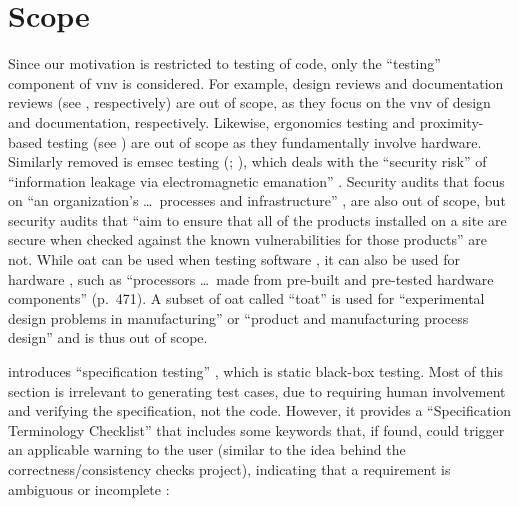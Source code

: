 \section{Scope}
\label{scope}

Since our motivation is restricted to testing of code, only the ``testing''
component of \acf{vnv} is considered.
For example, design reviews and documentation reviews
\ifnotpaper \citep[see][pp.~132, 144, respectively]{IEEE2017}
\else (see \cite[pp.~132, 144]{IEEE2017}, respectively) \fi
are out of scope, as they focus on the \acs{vnv} of design and documentation,
respectively. Likewise, ergonomics testing
and proximity-based testing (see \citealpISTQB{}) are out of scope as they
fundamentally involve hardware.
\ifnotpaper
    Similarly removed is \acf{emsec} testing
    (\citealp{ISO2021}; \citealp[p.~95]{ZhouEtAl2012}), which deals with the
    ``security risk'' of ``information leakage via electromagnetic emanation''
    \citep[p.~95]{ZhouEtAl2012}.
\fi Security audits that focus on ``an organization's
\dots\ processes and infrastructure'' \citepISTQB{}, are also out of scope,
but security audits that ``aim to ensure that all of the products installed on
a site are secure when checked against the known vulnerabilities for those
products'' \citep[p.~28]{Gerrard2000b} are not.
\ifnotpaper While \acf{oat}
    can be used when testing software \citep{Mandl1985}, it can also be used for
    hardware \citep[pp.~471-472]{Valcheva2013}, such as ``processors \dots\ made
    from pre-built and pre-tested hardware components'' (p.~471). A subset of
    \acs{oat} called ``\acf{toat}'' is used for ``experimental design problems in
    manufacturing'' \citep[p.~1573]{YuEtAl2011} or ``product and manufacturing
    process design'' \cite[p.~44]{Tsui2007} and is thus out of scope.

    \citeauthor{Patton2006} introduces ``specification testing''
    \citeyearpar[pp.~56-62]{Patton2006}, which is static black-box testing.
    Most of this section is irrelevant to generating test cases, due to
    requiring human involvement and verifying the specification, not the code.
    However, it provides a ``Specification Terminology Checklist''
    \citep[p.~61]{Patton2006} that includes some keywords that, if found, could
    trigger an applicable warning to the user (similar to the idea behind the
    correctness/consistency checks project), indicating that a requirement is
    ambiguous or incomplete \citep[see][p.~1-8]{SWEBOK2024}:

